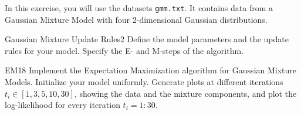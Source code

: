 \newif\ifvimbug
\vimbugfalse

\ifvimbug

\fi

 
In this exercise, you will use the datasets \texttt{gmm.txt}. It contains data from a Gaussian Mixture Model with four 2-dimensional Gaussian distributions.

\begin{questions}


\begin{question}{Gaussian Mixture Update Rules}{2}
Define the model parameters and the update rules for your model. 
Specify the E- and M-steps of the algorithm.

\begin{answer}
\end{answer}

\end{question}


\begin{question}{EM}{18}
Implement the Expectation Maximization algorithm for Gaussian Mixture Models. Initialize your model uniformly. Generate plots at different iterations $t_i \in [1,3,5,10,30]$, showing the data and the mixture components, and plot the log-likelihood for every iteration $t_i=1:30$.

\begin{answer}
\end{answer}

\end{question}

\end{questions}
